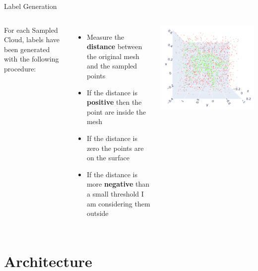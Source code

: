 \documentclass{beamer}
\begin{document}
\begin{frame}{Label Generation}
  \begin{columns}[T]
      For each Sampled Cloud, labels have been generated with the following procedure:
      \begin{itemize}
        \item Measure the \textbf{distance} between the original mesh and the sampled points
        \item If the distance is \textbf{positive} then the point are inside the mesh
        \item If the distance is zero the points are on the surface
        \item If the distance is more \textbf{negative} than a small threshold I am considering them outside
      \end{itemize}
  
      \vspace{-2em}
      \centering
      \includegraphics[width=0.9\linewidth]{../Media/example/sampled_cloud.png}
  \end{columns}
\end{frame}

\section{Architecture}
\end{document}
